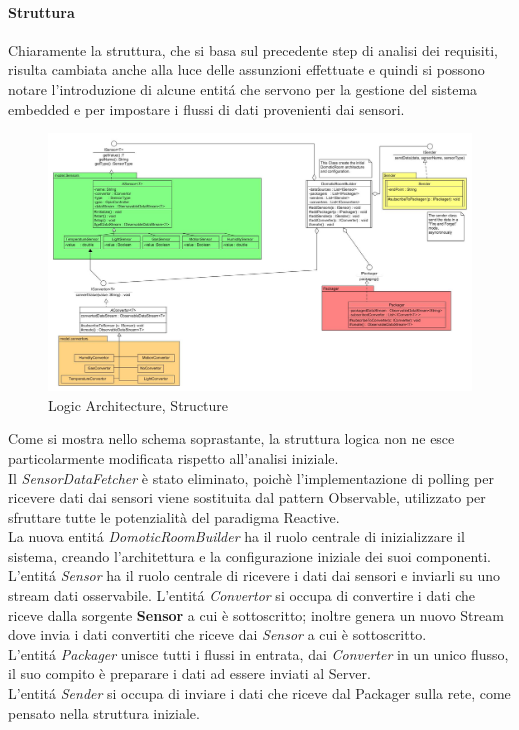 \afterpage{\clearpage}

\newpage


\paragraph{Struttura} Chiaramente la struttura, che si basa sul precedente step di analisi dei requisiti, risulta cambiata anche alla luce delle assunzioni effettuate e quindi si possono notare l'introduzione di alcune entit\'a che servono per la gestione del sistema embedded e per impostare i flussi di dati provenienti dai sensori.

\begin{figure}[h]
\centering
\includegraphics[scale=0.7]{Figures/LogicArchitecture/EmbeddedSystem/Structure}
\caption{Logic Architecture, Structure}
\end{figure}

Come si mostra nello schema soprastante, la struttura logica non ne esce particolarmente modificata rispetto all'analisi iniziale.\\
Il \textit{SensorDataFetcher} è stato eliminato, poich\`e l'implementazione di polling per ricevere dati dai sensori viene sostituita dal pattern Observable, utilizzato per sfruttare tutte le potenzialità del paradigma Reactive. \\
La nuova entit\'a \textit{DomoticRoomBuilder} ha il ruolo centrale di inizializzare il sistema, creando l'architettura e la configurazione iniziale dei suoi componenti.\\
L'entit\'a \textit{Sensor} ha il ruolo centrale di ricevere i dati dai sensori e inviarli su uno stream dati osservabile.
L'entit\'a \textit{Convertor} si occupa di convertire i dati che riceve dalla sorgente \textbf{Sensor} a cui è sottoscritto; inoltre genera un nuovo Stream dove invia i dati convertiti che riceve dai \textit{Sensor} a cui è sottoscritto.\\
L'entit\'a \textit{Packager} unisce tutti i flussi in entrata, dai \textit{Converter} in un unico flusso, il suo compito è preparare i dati ad essere inviati al Server.\\
L'entit\'a \textit{Sender} si occupa di inviare i dati che riceve dal Packager sulla rete, come pensato nella struttura iniziale.

